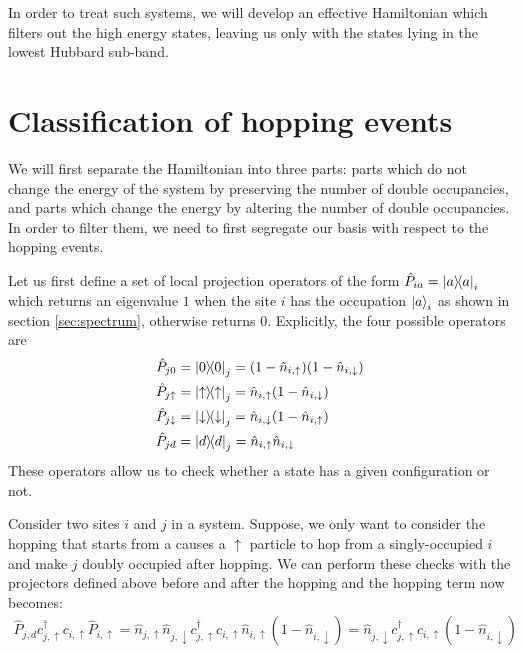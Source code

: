 \documentclass[]{report}
\begin{document}
In order to treat such systems, we will develop an effective Hamiltonian which filters out the high energy states, leaving us only with the states lying in the lowest Hubbard sub-band.

\section{Classification of hopping events}
We will first separate the Hamiltonian into three parts: parts which do not change the energy of the system by preserving the number of double occupancies, and parts which change the energy by altering the number of double occupancies. In order to filter them, we need to first segregate our basis with respect to the hopping events.

Let us first define a set of local projection operators of the form $ \hat{P}_{i a} = \op{a}_{i} $ which returns an eigenvalue $ 1 $ when the site $ i $ has the occupation $ \ket{a}_i $ as shown in section \ref{sec:spectrum}, otherwise returns 0. Explicitly, the four possible operators are
\begin{align}\label{eqn:projectors}
	\nonumber
	\hat{P}_{j 0} &= \op{0}_j = (1 - \hat{n}_{i, \uparrow})(1 - \hat{n}_{i, \downarrow})\\
	\nonumber
	\hat{P}_{j \uparrow} &= \op{\uparrow}_j = \hat{n}_{i, \uparrow} (1 - \hat{n}_{i, \downarrow})\\
	\nonumber
	\hat{P}_{j \downarrow} &= \op{\downarrow}_j = \hat{n}_{i, \downarrow} (1 - \hat{n}_{i, \uparrow})\\
	\hat{P}_{j d} &= \op{d}_j = \hat{n}_{i, \uparrow} \hat{n}_{i, \downarrow}
\end{align}
These operators allow us to check whether a state has a given configuration or not.

Consider two sites $ i $ and $ j $ in a system. Suppose, we only want to consider the hopping that starts from a  causes a $ \uparrow $ particle to hop from a singly-occupied $ i $ and make $ j $ doubly occupied after hopping. We can perform these checks with the projectors defined above before and after the hopping and the hopping term now becomes:
\begin{align}
	\hat{P}_{j, d} c^{\dagger}_{j, \uparrow} c_{i, \uparrow} \hat{P}_{i, \uparrow} = \hat{n}_{j, \uparrow}\hat{n}_{j, \downarrow} c^{\dagger}_{j, \uparrow} c_{i, \uparrow} \hat{n}_{i, \uparrow} (1 - \hat{n}_{i, \downarrow}) = \hat{n}_{j, \downarrow} c^{\dagger}_{j, \uparrow} c_{i, \uparrow} (1 - \hat{n}_{i, \downarrow})
\end{align}
\end{document}
